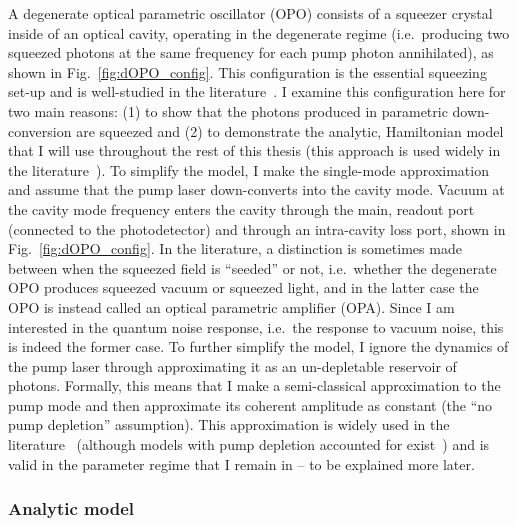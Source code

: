 A degenerate optical parametric oscillator (OPO) consists of a squeezer crystal inside of an optical cavity, operating in the degenerate regime (i.e.\ producing two squeezed photons at the same frequency for each pump photon annihilated), as shown in Fig.~\ref{fig:dOPO_config}. This configuration is the essential squeezing set-up and is well-studied in the literature~\cite{}. I examine this configuration here for two main reasons: (1) to show that the photons produced in parametric down-conversion are squeezed and (2) to demonstrate the analytic, Hamiltonian model that I will use throughout the rest of this thesis (this approach is used widely in the literature~\cite{}).  
To simplify the model, I make the single-mode approximation and assume that the pump laser down-converts into the cavity mode. Vacuum at the cavity mode frequency enters the cavity through the main, readout port (connected to the photodetector) and through an intra-cavity loss port, shown in Fig.~\ref{fig:dOPO_config}. 
In the literature, a distinction is sometimes made between when the squeezed field is ``seeded'' or not, i.e.\ whether the degenerate OPO produces squeezed vacuum or squeezed light, and in the latter case the OPO is instead called an optical parametric amplifier (OPA). Since I am interested in the quantum noise response, i.e.\ the response to vacuum noise, this is indeed the former case. 
To further simplify the model, I ignore the dynamics of the pump laser through approximating it as an un-depletable reservoir of photons. Formally, this means that I make a semi-classical approximation to the pump mode and then approximate its coherent amplitude as constant (the ``no pump depletion'' assumption). This approximation is widely used in the literature~\cite{} (although models with pump depletion accounted for exist~\cite{}) and is valid in the parameter regime that I remain in -- to be explained more later.

\subsubsection{Analytic model}
\label{sec:dOPO_model}

